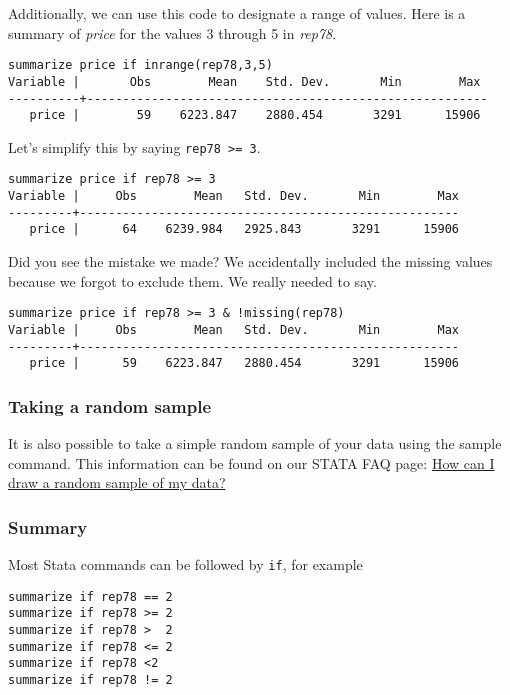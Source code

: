 Additionally, we can use this code to designate a range of values. Here is a summary of \textit{price} for the values 3 through 5 in \textit{rep78}.

\begin{lstlisting}
summarize price if inrange(rep78,3,5)
Variable |       Obs        Mean    Std. Dev.       Min        Max
----------+--------------------------------------------------------
   price |        59    6223.847    2880.454       3291      15906
\end{lstlisting}

Let's simplify this by saying \lstinline{rep78 >= 3}.

\begin{lstlisting}
summarize price if rep78 >= 3
Variable |     Obs        Mean   Std. Dev.       Min        Max
---------+-----------------------------------------------------
   price |      64    6239.984   2925.843       3291      15906
\end{lstlisting}

Did you see the mistake we made? We accidentally included the missing values because we forgot to exclude them. We really needed to say.

\begin{lstlisting}
summarize price if rep78 >= 3 & !missing(rep78)
Variable |     Obs        Mean   Std. Dev.       Min        Max
---------+-----------------------------------------------------
   price |      59    6223.847   2880.454       3291      15906
\end{lstlisting}

\subsubsection{Taking a random sample}

It is also possible to take a simple random sample of your data using the sample command. This information can be found on our STATA FAQ page: \href{http://www.ats.ucla.edu/stat/stata/faq/sample.htm}{How can I draw a random sample of my data?}

\subsubsection{Summary}

Most Stata commands can be followed by \lstinline{if}, for example

\begin{lstlisting}
summarize if rep78 == 2
summarize if rep78 >= 2
summarize if rep78 >  2
summarize if rep78 <= 2
summarize if rep78 <2
summarize if rep78 != 2
\end{lstlisting}

